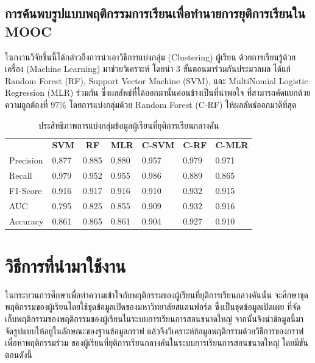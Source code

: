\documentclass[conference]{IEEEtran}
\def\moocs{การเรียนการสอนขนาดใหญ่}
\def\MOOCs{ระบบ{\moocs}}
\def\dropout{ยุติการเรียนกลางคัน}
\newcommand*{\thead}[1]{\multicolumn{1}{c}{\bfseries #1}}
\begin{document}
    \subsection{การค้นพบรูปแบบพฤติกรรมการเรียนเพื่อทำนายการยุติการเรียนใน MOOC \cite{paper:8085583}}
    ในกงานวิจัยชิ้นนี้ได้กล่าวถึงการนำเอาวิธีการแบ่งกลุ่ม (Clustering) ผู้เรียน ด้วยการเรียนรู้ด้วยเครื่อง (Machine Learning)
    มาช่วยวิเคราะห์ โดยนำ 3 ขั้นตอนมาร่วมกันประมวลผล ได้แก่ Random Forest (RF), 
    Support Vector Machine (SVM), และ MultiNomial Logistic Regression (MLR) ร่วมกัน 
    ซึ่งผลลัพธ์ที่ได้ออกมานั้นค่อนข้างเป็นที่น่าพอใจ ที่สามารถคัดแยกด้วยความถูกต้องที่ 97\%
    โดยการแบ่งกลุ่มด้วย Random Forest (C-RF) ให้ผลลัพธ์ออกมาดีที่สุด

    \begin{table}[ht!]
        \caption[clustering-performance]{ประสิทธิภาพการแบ่งกลุ่มข้อมูลผู้เรียนที่{\dropout}}
        \label{tab:clustering-performance}
        \begin{tabular}{p{1.2cm} p{0.7cm}p{0.7cm}p{0.7cm}p{0.7cm}p{0.7cm}p{0.7cm}}
            \hline
             & \thead{SVM} & \thead{RF} & \thead{MLR} & \thead{C-SVM} & \thead{C-RF} & \thead{C-MLR} \\
            Precision   & 0.877 & 0.885 & 0.880 & 0.957 & 0.979 & 0.971 \\
            Recall      & 0.979 & 0.952 & 0.955 & 0.986 & 0.889 & 0.865 \\
            F1-Score    & 0.916 & 0.917 & 0.916 & 0.910 & 0.932 & 0.915 \\
            AUC         & 0.795 & 0.825 & 0.855 & 0.909 & 0.932 & 0.916 \\
            Accuracy    & 0.861 & 0.865 & 0.861 & 0.904 & 0.927 & 0.910 \\
            \hline
        \end{tabular}
    \end{table}

    \section[technicalbackground]{วิธีการที่นำมาใช้งาน}

    ในกระบวนการศึกษาเพื่อทำความเข้าใจกับพฤติกรรมของผู้เรียนที่{\dropout}นั้น
    จะศึกษาชุดพฤติกรรมของผู้เรียนโดยใช้ชุดข้อมูลเปิดของมหาวิทยาลัยสแตนฟอร์ด 
    ซึ่งเป็นชุดข้อมูลเปิดเผย ที่จัดเก็บพฤติกรรมของพฤติกรรมของผู้เรียนใน{\MOOCs}
    จากนั้นจึงนำข้อมูลนี้มาจัดรูปแบบให้อยู่ในลักษณะของฐานข้อมูลกราฟ 
    แล้วจึงวิเคราะห์ข้อมูลพฤติกรรมด้วยวิธีการของกราฟเพื่อหาพฤติกรรมร่วม
    ของผู้เรียนที่{\dropout}ใน{\MOOCs} โดยมีขั้นตอนดังนี้
\end{document}
